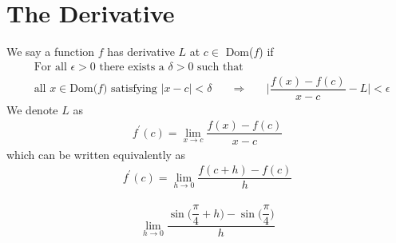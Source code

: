 \section{The Derivative}

\begin{definition}
We say a function $f$ has derivative $L$ at $c \in$ Dom($f$) if 
\begin{align*}
    &\text{For all} \hspace{4pt} \epsilon > 0 \hspace{4pt} \text{there exists a} \hspace{4pt} \delta > 0 \hspace{4pt} \text{such that}\\[2ex]
    &\text{all} \hspace{4pt} x \in \text{Dom($f$)} \hspace{4pt} \text{satisfying} \hspace{4pt} \lvert x-c \rvert < \delta \hspace{20pt} \Longrightarrow \hspace{20pt} \Big\lvert \dfrac{f(x)-f(c)}{x-c}-L \Big\rvert < \epsilon
\end{align*}
We denote $L$ as
\begin{align*}
f^{'}(c) = \lim_{x \longrightarrow c} \dfrac{f(x)-f(c)}{x-c}
\end{align*}
which can be written equivalently as
\begin{align*}
    f^{'}(c) = \lim_{h \longrightarrow 0} \dfrac{f(c+h)-f(c)}{h}
\end{align*}
\end{definition}

\begin{example}
\begin{align*}
    \lim_{h \longrightarrow 0} \dfrac{\sin\Big(\dfrac{\pi}{4} + h\Big) - \sin\Big(\dfrac{\pi}{4}\Big)}{h} 
\end{align*}

\end{example}